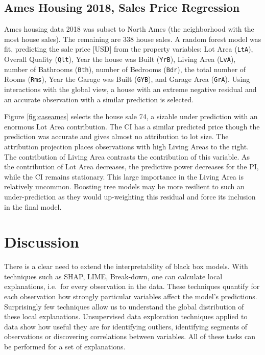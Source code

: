 \documentclass[
]{jss}
\begin{document}
\hypertarget{ames-housing-2018-sales-price-regression}{%
\subsection{Ames Housing 2018, Sales Price
Regression}\label{ames-housing-2018-sales-price-regression}}

Ames housing data 2018 \citep{de_cock_ames_2011, prevek18_ames_2018} was
subset to North Ames (the neighborhood with the most house sales). The
remaining are 338 house sales. A random forest model was fit, predicting
the sale price {[}USD{]} from the property variables: Lot Area
(\texttt{LtA}), Overall Quality (\texttt{Qlt}), Year the house was Built
(\texttt{YrB}), Living Area (\texttt{LvA}), number of Bathrooms
(\texttt{Bth}), number of Bedrooms (\texttt{Bdr}), the total number of
Rooms (\texttt{Rms}), Year the Garage was Built (\texttt{GYB}), and
Garage Area (\texttt{GrA}). Using interactions with the global view, a
house with an extreme negative residual and an accurate observation with
a similar prediction is selected.

Figure \ref{fig:caseames} selects the house sale 74, a sizable under
prediction with an enormous Lot Area contribution. The CI has a similar
predicted price though the prediction was accurate and gives almost no
attribution to lot size. The attribution projection places observations
with high Living Areas to the right. The contribution of Living Area
contrasts the contribution of this variable. As the contribution of Lot
Area decreases, the predictive power decreases for the PI, while the CI
remains stationary. This large importance in the Living Area is
relatively uncommon. Boosting tree models may be more resilient to such
an under-prediction as they would up-weighting this residual and force
its inclusion in the final model.

\hypertarget{sec:cheemdiscussion}{%
\section{Discussion}\label{sec:cheemdiscussion}}

There is a clear need to extend the interpretability of black box
models. With techniques such as SHAP, LIME, Break-down, one can
calculate local explanations, i.e.~for every observation in the data.
These techniques quantify for each observation how strongly particular
variables affect the model's predictions. Surprisingly few techniques
allow us to understand the global distribution of these local
explanations. Unsupervised data exploration techniques applied to data
show how useful they are for identifying outliers, identifying segments
of observations or discovering correlations between variables. All of
these tasks can be performed for a set of explanations.
\end{document}
